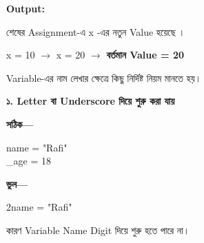 \textbf{Output:}

\begin{codebox}

\begin{english}
\end{english}

\end{codebox}

শেষের Assignment-এ
\textenglish{\ttfamily x}
-এর নতুন Value হয়েছে
\textenglish{}।

\begin{center}

\textenglish{\ttfamily x = 10}
\(\longrightarrow\)
\textenglish{\ttfamily x = 20}
\(\longrightarrow\)
\textbf{বর্তমান Value = 20}

\end{center}



Variable-এর নাম লেখার ক্ষেত্রে কিছু নির্দিষ্ট নিয়ম মানতে হয়।


\textbf{\color{darkTeal}১. Letter বা Underscore দিয়ে শুরু করা যায়}

\textbf{সঠিক—}

\begin{codebox}

\begin{english}
\ttfamily
name = "Rafi"\\
\_age = 18
\end{english}

\end{codebox}

\textbf{ভুল—}

\begin{codebox}

\begin{english}
\ttfamily
2name = "Rafi"
\end{english}

\end{codebox}

কারণ Variable Name Digit দিয়ে শুরু হতে পারে না।


